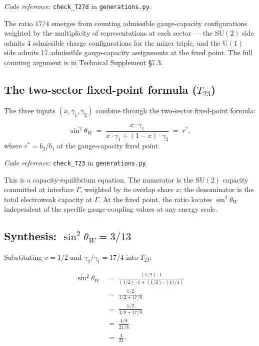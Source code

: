 \documentclass[11pt]{article}
\newcommand{\coderef}[2]{\smallskip\noindent\textit{Code reference:} \texttt{#1} in \texttt{#2}.}
\newcommand{\SU}{\mathrm{SU}}
\newcommand{\Un}{\mathrm{U}}
\newcommand{\epitag}[1]{\textbf{[#1]}}
\theoremstyle{definition}
\begin{document}
\coderef{check\_T27d}{generations.py}

The ratio $17/4$ emerges from counting admissible gauge-capacity configurations weighted by the multiplicity of representations at each sector --- the $\SU(2)$ side admits 4 admissible charge configurations for the mixer triple, and the $\Un(1)$ side admits 17 admissible gauge-capacity assignments at the fixed point. The full counting argument is in Technical Supplement \S7.3.

\subsection{The two-sector fixed-point formula ($T_{23}$)}\label{sec:T23}

The three inputs $(x, \gamma_1, \gamma_2)$ combine through the two-sector fixed-point formula:

\begin{tcolorbox}[apfbox, title={$T_{23}$ (Two-sector fixed-point formula) \epitag{P\_structural}}]
\[
\sin^2\theta_W \;=\; \frac{x \cdot \gamma_1}{x \cdot \gamma_1 + (1-x) \cdot \gamma_2} \;=\; r^*,
\]
where $r^* = b_2 / b_1$ at the gauge-capacity fixed point.
\end{tcolorbox}

\coderef{check\_T23}{generations.py}

This is a capacity-equilibrium equation. The numerator is the $\SU(2)$ capacity committed at interface $\Gamma$, weighted by its overlap share $x$; the denominator is the total electroweak capacity at $\Gamma$. At the fixed point, the ratio locates $\sin^2\theta_W$ independent of the specific gauge-coupling values at any energy scale.

\subsection{Synthesis: \texorpdfstring{$\sin^2\theta_W = 3/13$}{sin2 thetaW = 3/13}}\label{sec:sin2thetaW_synthesis}

Substituting $x = 1/2$ and $\gamma_2/\gamma_1 = 17/4$ into $T_{23}$:

\begin{align*}
\sin^2\theta_W
&\;=\; \frac{(1/2) \cdot 1}{(1/2) \cdot 1 + (1/2) \cdot (17/4)} \\
&\;=\; \frac{1/2}{1/2 + 17/8} \\
&\;=\; \frac{1/2}{4/8 + 17/8} \\
&\;=\; \frac{4/8}{21/8} \\
&\;=\; \frac{4}{21}.
\end{align*}
\end{document}
